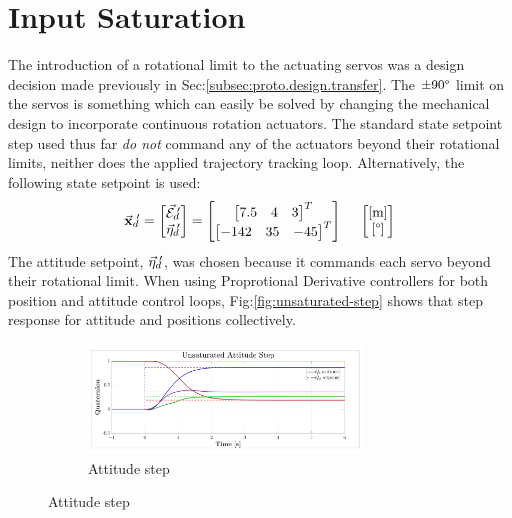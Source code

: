 \section{Input Saturation}
\label{sec:simulation.saturation}
The introduction of a rotational limit to the actuating servos was a design decision made previously in Sec:\ref{subsec:proto.design.transfer}. The $\pm 90\text{\textdegree}$ limit on the servos is something which can easily be solved by changing the mechanical design to incorporate continuous rotation actuators. The standard state setpoint step used thus far \emph{do not} command any of the actuators beyond their rotational limits, neither does the applied trajectory tracking loop. Alternatively, the following state setpoint is used:
\begin{equation}\label{eq:saturation-state-step}
\vec{\mathbf{x}}_d\text{}\hspace{-2pt}'=
\begin{bmatrix}
\vec{\mathcal{E}}_d\text{}\hspace{-2pt}'\\
\vec{\eta}_d\text{}\hspace{-2pt}'
\end{bmatrix}
=\begin{bmatrix}
\begin{bmatrix}
7.5 & 4 & 3
\end{bmatrix}^T
\\
\begin{bmatrix}
-142 & 35 & -45
\end{bmatrix}^T
\end{bmatrix}
~~~~\begin{bmatrix}
[\text{m}]\\
[\text{\textdegree}]
\end{bmatrix}
\end{equation}
The attitude setpoint, $\vec{\eta}_d\text{}\hspace{-2pt}'$, was chosen because it commands each servo beyond their rotational limit. When using Proprotional Derivative controllers for both position and attitude control loops, Fig:\ref{fig:unsaturated-step} shows that step response for attitude and positions collectively.
\begin{figure}[hbtp]
\vspace{-4pt}
\centering
\begin{subfigure}{\textwidth}
\centering
\includegraphics[width=0.8\textwidth]{graphs/unsaturated-attitude-step}
\vspace{-6pt}
\caption{Attitude step}
\label{fig:unsaturated-attitude-step}
\end{subfigure}
\vspace{-18pt}
\end{figure}
